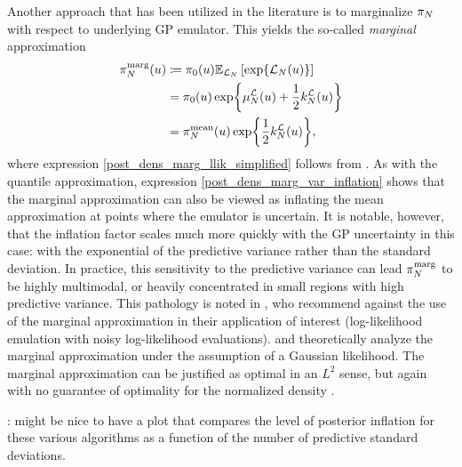 \documentclass[12pt]{article}
\begin{document}
Another approach that has been utilized in the literature is to marginalize $\llikEmRdm[\Ndesign]{\postDens}$
with respect to underlying GP emulator. This yields the so-called \textit{marginal} \citep{StuartTeck1} approximation 
\begin{align}
\llikEmMargDens[\Ndesign](\Par) 
&\Def \priorDens(\Par) \E_{\llikEm}\left[\Exp{\llikEm[\Ndesign](\Par)} \right] \label{post_dens_marg_llik} \\
&= \priorDens(\Par) \Exp{\emMean[\Ndesign]{\llik}(\Par) + \frac{1}{2} \emKer[\Ndesign]{\llik}(\Par)} \label{post_dens_marg_llik_simplified} \\
&= \llikEmMeanDens[\Ndesign](\Par) \Exp{\frac{1}{2} \emKer[\Ndesign]{\llik}(\Par)}, \label{post_dens_marg_var_inflation}
\end{align} 
where expression \ref{post_dens_marg_llik_simplified} follows from . 
As with the quantile approximation, expression \ref{post_dens_marg_var_inflation} shows that the marginal 
approximation can also be viewed as inflating the mean approximation at points where the emulator 
is uncertain. It is notable, however, that the inflation factor scales much more quickly with the GP 
uncertainty in this case: with the exponential of the predictive variance rather than the standard deviation.
In practice, this sensitivity to the predictive variance can lead $\llikEmMargDens[\Ndesign]$ to be highly 
multimodal, or heavily concentrated in small regions with high predictive variance. 
This pathology is noted in \cite{VehtariParallelGP}, who recommend against the use of the marginal approximation 
in their application of interest (log-likelihood emulation with noisy log-likelihood evaluations). 
\citet{StuartTeck1} and \citet{StuartTeck2} theoretically analyze the marginal approximation under the assumption of 
a Gaussian likelihood. The marginal approximation can be justified as optimal in an $L^2$ sense, but again 
with no guarantee of optimality for the normalized density \citep{VehtariParallelGP, StuartTeck1}. 

\todo: might be nice to have a plot that compares the level of posterior inflation for these various algorithms as 
a function of the number of predictive standard deviations. 

\end{document}
